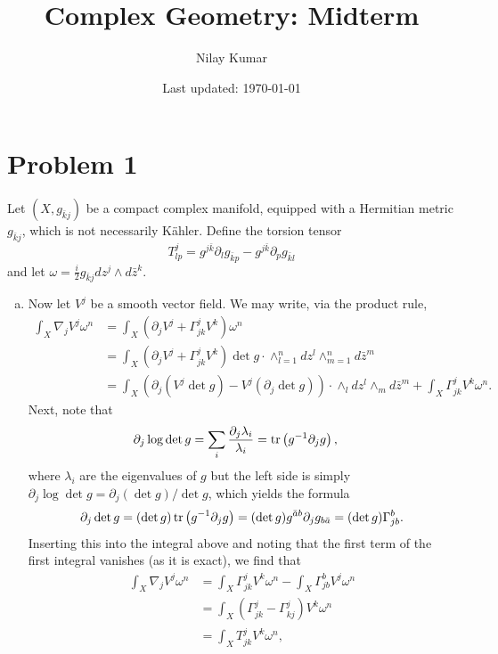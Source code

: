 \documentclass{../mathnotes}
\title{Complex Geometry: Midterm}
\author{Nilay Kumar}
\date{Last updated: \today}
\begin{document}
\maketitle

\section*{Problem 1}

Let $(X,g_{\bar kj})$ be a compact complex manifold, equipped with a Hermitian metric $g_{\bar kj}$,
which is not necessarily K\"ahler. Define the torsion tensor
\[T^j_{lp}=g^{j\bar k}\partial_lg_{\bar kp}-g^{j\bar k}\partial_pg_{\bar kl}\]
and let $\omega=\frac{i}{2}g_{\bar kj}dz^j\wedge d\bar z^k$.
\begin{enumerate}[(a)]
    \item Now let $V^j$ be a smooth vector field. We may write, via the product rule,
        \begin{align*}
            \int_X \nabla_j V^j\omega^n&=\int_X\left( \partial_jV^j+\Gamma^j_{jk}V^k \right)\omega^n\\
            &=\int_X\left( \partial_jV^j+\Gamma_{jk}^jV^k \right)\det g\cdot\wedge^n_{l=1}dz^l\wedge^n_{m=1}d\bar z^m\\
            &=\int_X\left(\partial_j(V^j\det g)-V^j(\partial_j\det g)\right)\cdot\wedge_l dz^l\wedge_m d\bar z^m
            +\int_X \Gamma^j_{jk}V^k\omega^n.
        \end{align*}
        Next, note that
        \begin{align*}
            \partial_j\log\det g&=\sum_i \frac{\partial_j\lambda_i}{\lambda_i}=\operatorname{tr}\left( g^{-1}\partial_jg\right),
        \end{align*}
        where $\lambda_i$ are the eigenvalues of $g$ but the left side is simply $\partial_j\log\det g=\partial_j(\det g)/\det g$, which yields the formula
        \[\partial_j\det g=(\det g)\operatorname{tr}\left( g^{-1}\partial_jg \right)=(\det g)g^{\bar ab}\partial_jg_{b\bar a}=(\det g)\Gamma^{b}_{jb}.\]
        Inserting this into the integral above and noting that the first term of the first integral vanishes (as it is exact),
        we find that
        \begin{align*}
            \int_X\nabla_jV^j\omega^n&=\int_X\Gamma^j_{jk}V^k\omega^n-\int_X \Gamma_{jb}^bV^j\omega^n\\
            &=\int_X \left( \Gamma^{j}_{jk}-\Gamma^{j}_{kj} \right)V^k\omega^n\\
            &=\int_X T^{j}_{jk}V^k\omega^n,
        \end{align*}

\end{enumerate}
\end{document}
